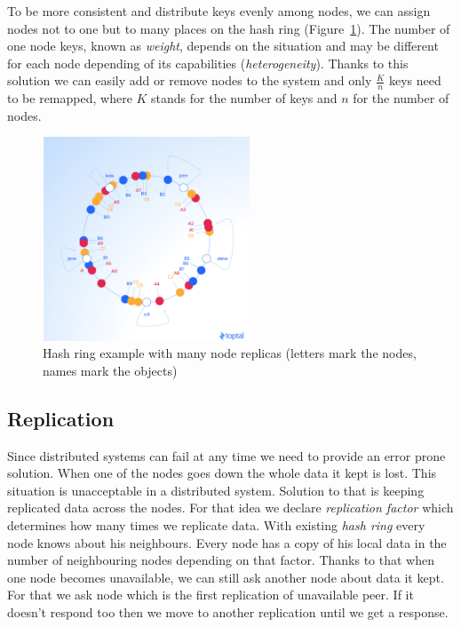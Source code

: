         To be more consistent and distribute keys evenly among nodes, we can assign nodes not to one but to many places on the hash ring (Figure~\ref{ConsistentHashingImage2}).
        The number of one node keys, known as \textit{weight}, depends on the situation and may be different for each node depending of its capabilities (\textit{heterogeneity}). 
        Thanks to this solution we can easily add or remove nodes to the system and only $\frac{K}{n}$ keys need to be remapped, where $K$ stands for the number of keys and $n$ for the number of nodes.
        

        
        \begin{figure}[ht]
            \centering
                \includegraphics[width=0.55\textwidth]{thesis/figures/vnodes.png}
            \caption{Hash ring example with many node replicas (letters mark the nodes, names mark the objects) \cite{ConsistentHashing}}
            \label{ConsistentHashingImage2}
        \end{figure}
        
    \subsection{Replication} 
        Since distributed systems can fail at any time we need to provide an error prone solution.
        When one of the nodes goes down the whole data it kept is lost.
        This situation is unacceptable in a distributed system.
        Solution to that is keeping replicated data across the nodes.
        For that idea we declare \textit{replication factor} which determines how many times we replicate data.
        With existing \textit{hash ring} every node knows about his neighbours.
        Every node has a copy of his local data in the number of neighbouring nodes depending on that factor.
        Thanks to that when one node becomes unavailable, we can still ask another node about data it kept.
        For that we ask node which is the first replication of unavailable peer.
        If it doesn't respond too then we move to another replication until we get a response.
        
